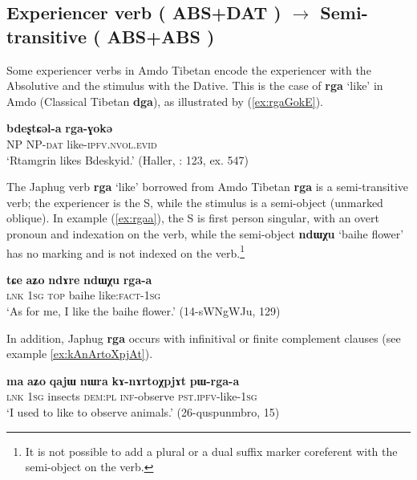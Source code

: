 \documentclass[oneside,a4paper,11pt]{article}
\makeatletter
\newcommand{\ipa}[1]{{\phon\textbf{\mbox{#1}}}} %
\newcommand{\refb}[1]{(\ref{#1})}
\def\fakesc#1{%
  \begingroup%
  \xdef\fake@name{\csname\curr@fontshape/\f@size\endcsname}%
  \fontsize{\fontdimen8\fake@name}{\baselineskip}\selectfont%
  \uppercase{#1}%
  \endgroup%
}
\makeatother
\begin{document}
\subsection{Experiencer verb (\fakesc{abs+dat}) $\rightarrow$ Semi-transitive (\fakesc{abs+abs})}
Some experiencer verbs in Amdo Tibetan encode the experiencer with the Absolutive and the stimulus with the Dative. This is the case of \ipa{rga} `like' in Amdo (Classical Tibetan \ipa{dga}), as illustrated by \refb{ex:rgaGokE}.

\begin{exe}
\ex \label{ex:rgaGokE}
\gll \ipa{ʂtamɖʐən}  \ipa{bdeʂtɕəl-a}  \ipa{rga-ɣokə} \\
NP NP-\textsc{dat} like-\textsc{ipfv.nvol.evid} \\
\glt `Rtamgrin likes Bdeskyid.' (Haller, \citeyear{haller04themchen}: 123, ex. 547)
\end{exe}

The Japhug verb \ipa{rga} `like' borrowed from Amdo Tibetan \ipa{rga} is a semi-transitive verb; the experiencer is the S, while the stimulus is a semi-object (unmarked oblique). In example \refb{ex:rgaa}, the S is first person singular,  with an overt pronoun and indexation on the verb, while the semi-object \ipa{ndɯχu} `baihe flower' has no marking and is not indexed on the verb.\footnote{It is not possible to add a plural or a dual suffix marker coreferent with the semi-object on the verb.}  

\begin{exe}
\ex \label{ex:rgaa}
\gll
\ipa{tɕe} 	\ipa{aʑo} 	\ipa{ndɤre} 	\ipa{ndɯχu} 	\ipa{rga-a} \\
\textsc{lnk} \textsc{1sg} \textsc{top} baihe like:\textsc{fact}-\textsc{1sg} \\
\glt `As for me, I like the baihe flower.' (14-sWNgWJu, 129)
\end{exe}


In addition, Japhug \ipa{rga}  occurs with infinitival or finite complement clauses (see example \ref{ex:kAnArtoXpjAt}).

\begin{exe}
\ex \label{ex:kAnArtoXpjAt}
\gll  
\ipa{ma} 	\ipa{aʑo} 	\ipa{qajɯ} 	\ipa{nɯra} 	\ipa{kɤ-nɤrtoχpjɤt} 	\ipa{pɯ-rga-a} \\
\textsc{lnk} \textsc{1sg} insects \textsc{dem:pl} \textsc{inf}-observe \textsc{pst.ipfv}-like-\textsc{1sg} \\
\glt `I used to like to observe animals.' (26-quspunmbro, 15)
\end{exe}
\end{document}
